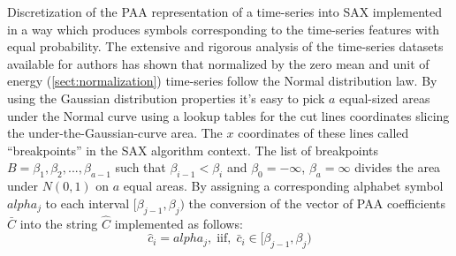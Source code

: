 Discretization of the PAA representation of a time-series into SAX implemented in a way which produces symbols corresponding to the time-series features with equal probability. The extensive and rigorous analysis of the time-series datasets available for authors has shown that normalized by the zero mean and unit of energy (\ref{sect:normalization}) time-series follow the Normal distribution law. By using the Gaussian distribution properties it's easy to pick $a$ equal-sized areas under the Normal curve using a lookup tables  \cite{citeulike:4434481} for the cut lines coordinates slicing the under-the-Gaussian-curve area. 
The $x$ coordinates of these lines called ``breakpoints'' in the SAX algorithm context. The list of breakpoints $B=\beta_{1}, \beta_{2}, ... , \beta_{a-1}$ such that $\beta_{i-1} < \beta_{i}$ and $\beta_{0} = -\infty$, $\beta_{a} = \infty$ divides the area under $N(0,1)$ on $a$ equal areas. By assigning a corresponding alphabet symbol $alpha_{j}$ to each interval $[\beta_{j-1},\beta_{j})$ the conversion of the vector of PAA coefficients $\bar{C}$ into the string $\hat{C}$ implemented as follows:
\begin{equation}
\hat{c}_{i} = alpha_{j}, \; \text{iif}, \; \bar{c}_{i} \in [\beta_{j-1},\beta_{j})
\label{eq:alpha}
\end{equation}

